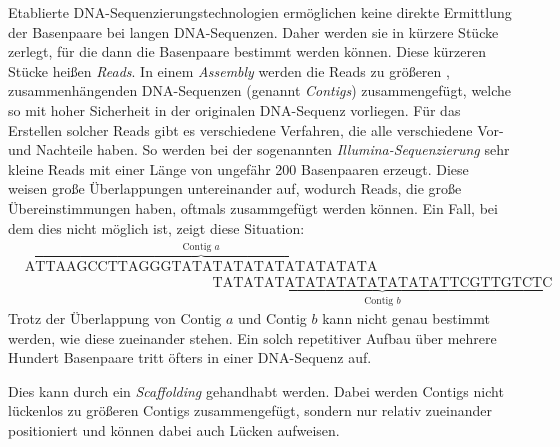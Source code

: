 Etablierte DNA-Sequenzierungstechnologien ermöglichen keine direkte Ermittlung der Basenpaare bei langen DNA-Sequenzen. Daher werden sie in kürzere Stücke zerlegt, für die dann die Basenpaare bestimmt werden können. Diese 
kürzeren Stücke heißen \emph{Reads}. In einem \emph{Assembly} werden die Reads zu größeren
, zusammenhängenden DNA-Sequenzen (genannt \emph{Contigs}) zusammengefügt, welche so mit hoher Sicherheit in der originalen DNA-Sequenz vorliegen. 
Für das Erstellen solcher Reads gibt es verschiedene Verfahren, die alle verschiedene Vor- und Nachteile haben. So werden bei der sogenannten 
\emph{Illumina-Sequenzierung} \cite{Illumina} sehr kleine Reads mit einer Länge von ungefähr 200 Basenpaaren erzeugt. %
Diese weisen große Überlappungen untereinander auf, wodurch Reads, die große Übereinstimmungen haben, oftmals zusammgefügt werden können. Ein Fall, bei dem dies nicht möglich ist, zeigt diese Situation:
\begin{align*}
&\overset{\text{Contig } a}{\overbrace{\text{ATTAAGCCTTAGGGTATATATATATATATATATA}}}\\
&\phantom{\text{ATTAAGCCTTAGGGTATA}}\underset{\text{Contig } b}{\underbrace{\text{TATATATATATATATATATATATTCGTTGTCTC}}}
\end{align*}
Trotz der Überlappung von Contig $a$ und Contig $b$
kann nicht genau bestimmt werden, wie diese zueinander stehen. Ein solch repetitiver Aufbau über mehrere 
Hundert Basenpaare tritt 
öfters in einer DNA-Sequenz auf.


Dies kann durch ein \emph{Scaffolding} gehandhabt werden. Dabei werden Contigs nicht lückenlos zu 
größeren Contigs zusammengefügt, sondern nur relativ zueinander 
positioniert und können dabei auch Lücken 
aufweisen.

